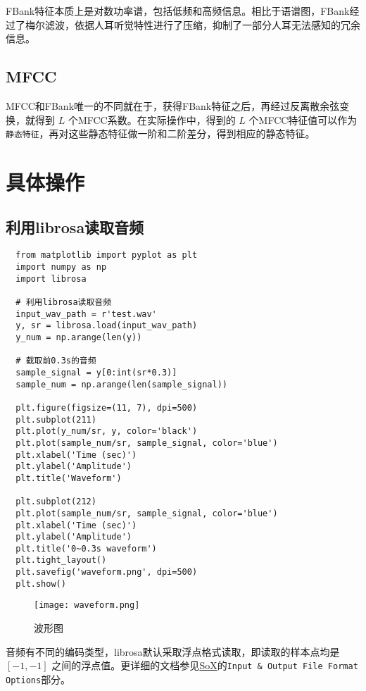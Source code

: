 \documentclass[cn,10pt,math=newtx,citestyle=gb7714-2015,bibstyle=gb7714-2015]{elegantbook}
\begin{document}
FBank特征本质上是对数功率谱，包括低频和高频信息。相比于语谱图，FBank经过了梅尔滤波，依据人耳听觉特性进行了压缩，抑制了一部分人耳无法感知的冗余信息。

\subsection{MFCC}

MFCC和FBank唯一的不同就在于，获得FBank特征之后，再经过反离散余弦变换，就得到 $L$ 个MFCC系数。在实际操作中，得到的 $L$ 个MFCC特征值可以作为\lstinline{静态特征}，再对这些静态特征做一阶和二阶差分，得到相应的静态特征。

\section{具体操作}

\subsection{利用librosa读取音频}

\begin{lstlisting}
  from matplotlib import pyplot as plt
  import numpy as np
  import librosa

  # 利用librosa读取音频
  input_wav_path = r'test.wav'
  y, sr = librosa.load(input_wav_path)
  y_num = np.arange(len(y))
  
  # 截取前0.3s的音频
  sample_signal = y[0:int(sr*0.3)]
  sample_num = np.arange(len(sample_signal))
  
  plt.figure(figsize=(11, 7), dpi=500)
  plt.subplot(211)
  plt.plot(y_num/sr, y, color='black')
  plt.plot(sample_num/sr, sample_signal, color='blue')
  plt.xlabel('Time (sec)')
  plt.ylabel('Amplitude')
  plt.title('Waveform')
  
  plt.subplot(212)
  plt.plot(sample_num/sr, sample_signal, color='blue')
  plt.xlabel('Time (sec)')
  plt.ylabel('Amplitude')
  plt.title('0~0.3s waveform')
  plt.tight_layout()
  plt.savefig('waveform.png', dpi=500)
  plt.show()
\end{lstlisting}

\begin{figure}[htbp]
  \centering
  \texttt{[image: waveform.png]}
  \caption{波形图 \label{fig:waveform}}
\end{figure}


音频有不同的编码类型，librosa默认采取浮点格式读取，即读取的样本点均是 $[-1,-1]$ 之间的浮点值。更详细的文档参见\href{http://sox.sourceforge.net/sox.html}{SoX}的\lstinline{Input & Output File Format Options}部分。
\end{document}
